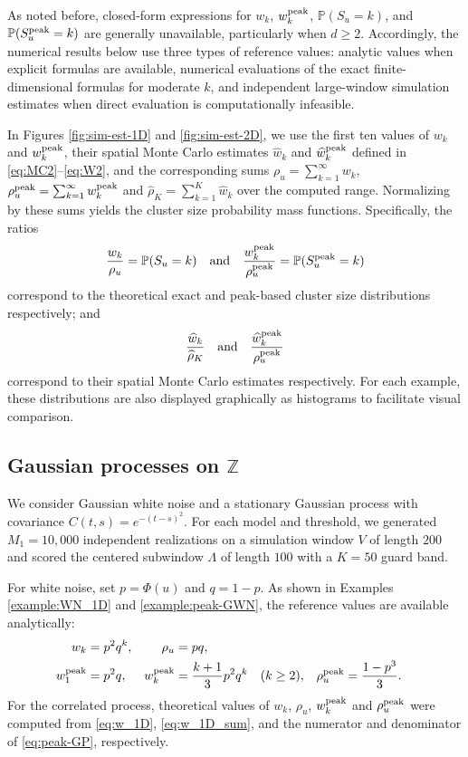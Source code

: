 \documentclass[aap,preprint]{imsart}
\theoremstyle{plain}
\theoremstyle{definition}
\def\P{{\mathbb P}}
\begin{document}
	As noted before, closed-form expressions for $w_k$, $w_k^{\rm peak}$, $\P(S_u=k)$, and $\P(S_u^{\rm peak}=k)$ are generally unavailable, particularly when $d\geq2$. Accordingly, the numerical results below use three types of reference values: analytic values when explicit formulas are available, numerical evaluations of the exact finite-dimensional formulas for moderate $k$, and independent large-window simulation estimates when direct evaluation is computationally infeasible.
	
	In Figures \ref{fig:sim-est-1D} and \ref{fig:sim-est-2D}, we use the first ten values of $w_k$ and $w_k^{\rm peak}$, their spatial Monte Carlo estimates $\widehat{w}_k$ and $\widehat{w}_k^{\rm peak}$ defined in \eqref{eq:MC2}--\eqref{eq:W2}, and the corresponding sums $\rho_u=\sum_{k=1}^\infty w_k$, $\rho_u^{\rm peak}=\sum_{k=1}^\infty w_k^{\rm peak}$ and  $\widehat\rho_K = \sum_{k=1}^K \widehat{w}_k$ over the computed range. Normalizing by these sums yields the cluster size probability mass functions. Specifically, the ratios
	\[
	\frac{w_k}{\rho_u}=\P(S_u=k) \quad \text{and} \quad \frac{w_k^{\rm peak}}{\rho_u^{\rm peak}}=\P(S_u^{\rm peak}=k)
	\]
	correspond to the theoretical exact and peak-based cluster size distributions respectively; and 
	\[
	\frac{\widehat{w}_k}{\widehat\rho_K} \quad \text{and} \quad \frac{\widehat{w}_k^{\rm peak}}{\rho_u^{\rm peak}}
	\]
	correspond to their spatial Monte Carlo estimates respectively. For each example, these distributions are also displayed graphically as histograms to facilitate visual comparison.
	
	
	\subsection{Gaussian processes on $\mathbb{Z}$}
	We consider Gaussian white noise and a stationary Gaussian process with
	covariance $C(t,s)=e^{-(t-s)^2}$.  For each model and threshold, we generated $M_1=10{,}000$ independent realizations on a simulation window $V$ of length $200$ and scored the centered subwindow $\Lambda$ of length $100$ with a $K=50$ guard band. 
	
	For white noise, set $p=\Phi(u)$ and $q=1-p$.  As shown in Examples \ref{example:WN_1D} and \ref{example:peak-GWN}, the reference values are
	available analytically:
	\begin{align*}
		w_k&=p^2q^k,& \rho_u&=pq,\\
		w_1^{\rm peak}&=p^2q,&
		w_k^{\rm peak}&=\frac{k+1}{3}p^2q^k\quad(k\geq2),&
		\rho_u^{\rm peak}&=\frac{1-p^3}{3}.
	\end{align*}
	For the correlated process,  theoretical values of $w_k$, $\rho_u$, $w_k^{\rm peak}$ and $\rho_u^{\rm peak}$ were computed from \eqref{eq:w_1D}, \eqref{eq:w_1D_sum}, and the numerator and denominator of \eqref{eq:peak-GP}, respectively. 
	
\end{document}
